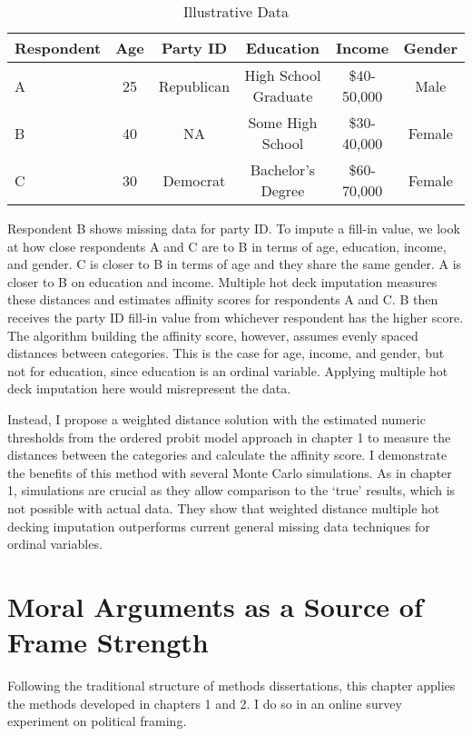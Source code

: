 \documentclass[11pt]{article}
\begin{document}
\begin{table}[H]
  \centering
  \singlespacing
  \begin{tabular}{lccccc}
  \bottomrule 
  \midrule
  Respondent & Age & Party ID & Education & Income & Gender\\
  \hline
  A & 25 & Republican & High School Graduate & \$40-50,000 & Male \\
  B & 40 & NA & Some High School &  \$30-40,000 & Female\\
  C & 30 & Democrat & Bachelor's Degree &  \$60-70,000 & Female\\
  \bottomrule 
  \end{tabular}
  \caption{Illustrative Data}
  \label{affscore}
\end{table}

Respondent B shows missing data for party ID. To impute a fill-in value, we look at how close respondents A and C are to B in terms of age, education, income, and gender. C is closer to B in terms of age and they share the same gender. A is closer to B on education and income. Multiple hot deck imputation measures these distances and estimates affinity scores for respondents A and C. B then receives the party ID fill-in value from whichever respondent has the higher score. The algorithm building the affinity score, however, assumes evenly spaced distances between categories. This is the case for age, income, and gender, but not for education, since education is an ordinal variable. Applying multiple hot deck imputation here would misrepresent the data.

Instead, I propose a weighted distance solution with the estimated numeric thresholds from the ordered probit model approach in chapter 1 to measure the distances between the categories and calculate the affinity score. I demonstrate the benefits of this method with several Monte Carlo simulations. As in chapter 1, simulations are crucial as they allow comparison to the `true' results, which is not possible with actual data. They show that weighted distance multiple hot decking imputation outperforms current general missing data techniques for ordinal variables.


\section{Moral Arguments as a Source of Frame Strength} 

Following the traditional structure of methods dissertations, this chapter applies the methods developed in chapters 1 and 2. I do so in an online survey experiment on political framing. 
\end{document}
